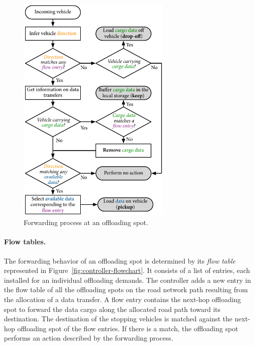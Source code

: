 \begin{figure}
    \includegraphics[width=7.5cm]{figures/forwarding.pdf}
    \caption{Forwarding process at an offloading spot.}
    \label{fig:forwarding-process}
\end{figure}
\paragraph{Flow tables.} 
The forwarding behavior of an offloading spot is determined by its \textit{flow table} represented in Figure~\ref{fig:controller-flowchart}. It consists of a list of entries, each installed for an individual offloading demands. The controller adds a new entry in the flow table of all the offloading spots on the road network path resulting from the allocation of a data transfer.
A flow entry contains the next-hop offloading spot to forward the data cargo along the allocated road path toward its destination.
The destination of the stopping vehicles is matched against the next-hop offloading spot of the flow entries. If there is a match, the offloading spot performs an action described by the forwarding process.

